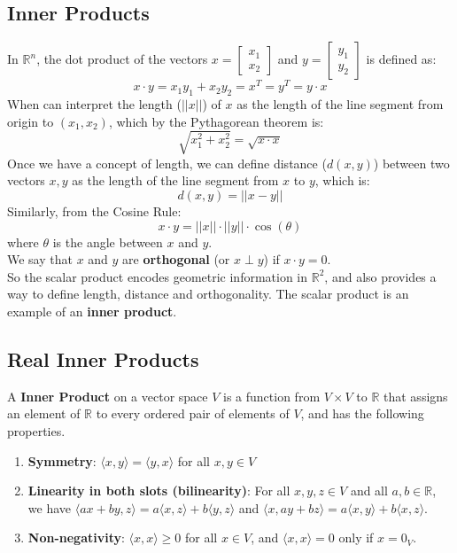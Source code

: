 \documentclass[a4paper, 9pt]{extarticle}
\begin{document}
\subsection{Inner Products}
In $\mathbb{R}^n$, the dot product of the vectors $x = \begin{bmatrix}x_1 \\ x_2 \end{bmatrix}$ and $y = \begin{bmatrix}y_1 \\ y_2 \end{bmatrix}$ is defined as:
$$
  x \cdot y = x_1y_1 + x_2y_2 = x^T = y^T = y\cdot x
$$
When can interpret the length ($||x||$) of $x$ as the length of the line segment from origin to $(x_1, x_2)$, which by the Pythagorean theorem is:
$$
  \sqrt{x_1^2 + x_2^2} = \sqrt{x \cdot x}
$$
Once we have a concept of length, we can define distance ($d(x,y)$) between two vectors $x,y$ as the length of the line segment from $x$ to $y$, which is:
$$
  d(x,y) = ||x - y||
$$
Similarly, from the Cosine Rule:
$$x\cdot y = ||x|| \cdot ||y|| \cdot \cos(\theta)$$
where $\theta$ is the angle between $x$ and $y$. \\
We say that $x$ and $y$ are \textbf{orthogonal} (or $x \perp y$) if $x \cdot y = 0$. \\[2ex]
So the scalar product encodes geometric information in $\mathbb{R}^2$, and also provides a way to define length, distance and orthogonality. The scalar product is an example of an \textbf{inner product}.
\subsection{Real Inner Products}
A \textbf{{Inner Product}} on a vector space $V$ is a function from $V \times V$ to $\mathbb{R}$ that assigns an element of $\mathbb{R}$ to every ordered pair of elements of $V$, and has the following properties.

\begin{enumerate}
  \item \textbf{Symmetry}: $\langle x, y \rangle = \langle y, x \rangle$ for all $x, y \in V$
  \item \textbf{Linearity in both slots (bilinearity)}: For all $x, y, z \in V$ and all $a, b \in \mathbb{R}$, we have
        $\langle ax + by, z \rangle = a\langle x, z \rangle + b\langle y, z \rangle$ and
        $\langle x, ay + bz \rangle = a\langle x, y \rangle + b\langle x, z \rangle$.
  \item \textbf{Non-negativity}: $\langle x, x \rangle \geq 0$ for all $x \in V$, and $\langle x, x \rangle = 0$ only if $x = 0_V$.
\end{enumerate}
\end{document}

